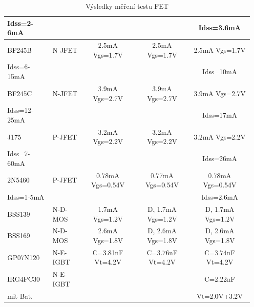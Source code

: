 \begin{table}[H]
\begin{center}
\begin{tabular}{| l | l | c | c | c |}
Idss=2-6mA   &         &                  &                  & Idss=3.6mA      \\
    \hline
BF245B       & N-JFET  & 2.5mA Vgs=1.7V   & 2.5mA Vgs=1.7V   & 2.5mA Vgs=1.7V \\
Idss=6-15mA  &         &                  &                  & Idss=10mA      \\
    \hline
BF245C       & N-JFET  & 3.9mA Vgs=2.7V   & 3.9mA Vgs=2.7V   & 3.9mA Vgs=2.7V \\
Idss=12-25mA &         &                  &                  & Idss=17mA    \\
    \hline
J175        & P-JFET   & 3.2mA Vgs=2.2V   & 3.2mA Vgs=2.2V   & 3.2mA Vgs=2.2V \\
Idss=7-60mA &          &                  &                  & Idss=26mA      \\
    \hline
2N5460      & P-JFET   & 0.78mA Vgs=0.54V & 0.77mA Vgs=0.54V & 0.78mA Vgs=0.54V \\
Idss=1-5mA  &          &                  &                  & Idss=2.6mA       \\
    \hline
BSS139      & N-D-MOS  & 1.7mA Vgs=1.2V  & D, 1.7mA Vgs=1.2V & D, 1.7mA Vgs=1.2V \\
    \hline
BSS169      & N-D-MOS  & 2.6mA Vgs=1.8V  & D, 2.6mA Vgs=1.8V & D, 2.6mA Vgs=1.8V \\
    \hline
GP07N120    & N-E-IGBT & C=3.81nF Vt=4.2V & C=3.76nF Vt=4.2V & C=3.74nF Vt=4.2V \\
    \hline
IRG4PC30    & N-E-IGBT &                  &                  & C=2.22nF         \\
mit Bat.    &          &                  &                  & Vt=2.0V+3.2V \\
    \hline
    \end{tabular}
  \end{center}
  \caption{Výsledky měření testu FET}
  \label{tab:mos} 
\end{table}
